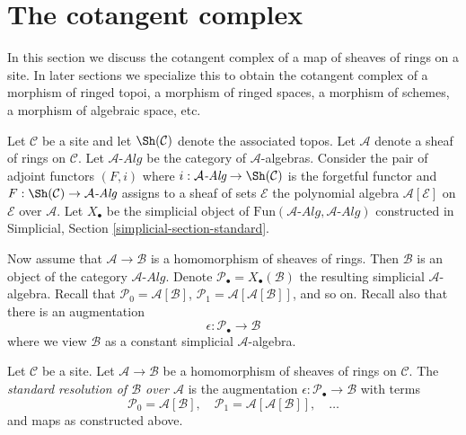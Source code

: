\section{The cotangent complex}
\label{section-cotangent-complex}

\noindent
In this section we discuss the cotangent complex of a map of sheaves
of rings on a site. In later sections we specialize this to obtain
the cotangent complex of a morphism of ringed topoi, a morphism of
ringed spaces, a morphism of schemes, a morphism of algebraic space, etc.

\medskip\noindent
Let $\mathcal{C}$ be a site and let $\Sh(\mathcal{C})$ denote the
associated topos. Let $\mathcal{A}$ denote a sheaf of rings
on $\mathcal{C}$. Let $\mathcal{A}\textit{-Alg}$ be the category of
$\mathcal{A}$-algebras. Consider the pair of adjoint functors $(F, i)$ where
$i : \mathcal{A}\textit{-Alg} \to \Sh(\mathcal{C})$ is the forgetful functor and
$F : \Sh(\mathcal{C}) \to \mathcal{A}\textit{-Alg}$ assigns to a sheaf of sets
$\mathcal{E}$ the polynomial algebra $\mathcal{A}[\mathcal{E}]$ on
$\mathcal{E}$ over $\mathcal{A}$.
Let $X_\bullet$ be the simplicial object of
$\text{Fun}(\mathcal{A}\textit{-Alg}, \mathcal{A}\textit{-Alg})$
constructed in
Simplicial, Section \ref{simplicial-section-standard}.

\medskip\noindent
Now assume that $\mathcal{A} \to \mathcal{B}$ is a homomorphism of sheaves
of rings. Then $\mathcal{B}$ is an object of the category
$\mathcal{A}\textit{-Alg}$. Denote
$\mathcal{P}_\bullet = X_\bullet(\mathcal{B})$ the resulting
simplicial $\mathcal{A}$-algebra.
Recall that
$\mathcal{P}_0 = \mathcal{A}[\mathcal{B}]$,
$\mathcal{P}_1 = \mathcal{A}[\mathcal{A}[\mathcal{B}]]$, and so on.
Recall also that there is an augmentation
$$
\epsilon : \mathcal{P}_\bullet \longrightarrow \mathcal{B}
$$
where we view $\mathcal{B}$ as a constant simplicial $\mathcal{A}$-algebra.

\begin{definition}
\label{definition-standard-resolution-sheaves-rings}
Let $\mathcal{C}$ be a site.
Let $\mathcal{A} \to \mathcal{B}$ be a homomorphism of sheaves of rings
on $\mathcal{C}$. The {\it standard resolution of $\mathcal{B}$ over
$\mathcal{A}$} is the augmentation
$\epsilon : \mathcal{P}_\bullet \to \mathcal{B}$
with terms
$$
\mathcal{P}_0 = \mathcal{A}[\mathcal{B}],\quad
\mathcal{P}_1 = \mathcal{A}[\mathcal{A}[\mathcal{B}]],\quad \ldots
$$
and maps as constructed above.
\end{definition}

